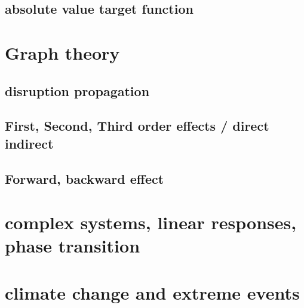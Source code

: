 \subsection{absolute value target function}


\section{Graph theory}

\subsection{disruption propagation}

\subsection{First, Second, Third order effects / direct indirect}

\subsection{Forward, backward effect}


\section{complex systems, linear responses, phase transition}


\section{climate change and extreme events}